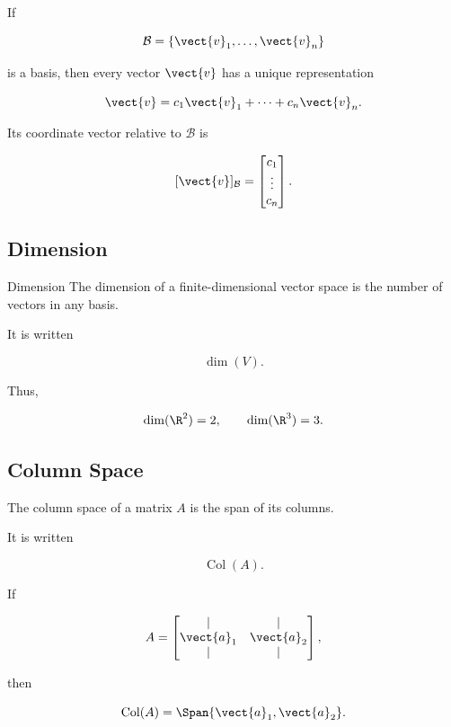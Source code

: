 If

\[ \mathcal B=\{\vect{v}_1,\ldots,\vect{v}_n\} \]

is a basis, then every vector \(\vect{v}\) has a unique representation

\[ \vect{v}=c_1\vect{v}_1+\cdots+c_n\vect{v}_n. \]

Its coordinate vector relative to \(\mathcal B\) is

\[ [\vect{v}]_{\mathcal B}
=
\begin{bmatrix}c_1\\\vdots\\c_n\end{bmatrix}. \]

\subsection{Dimension}
\label{subsec:dimension}

\begin{definitionbox}{Dimension}
The dimension of a finite-dimensional vector space is the number of vectors
in any basis.
\end{definitionbox}

It is written

\[ \dim(V). \]

Thus,

\[ \dim(\R^2)=2,\qquad \dim(\R^3)=3. \]

\subsection{Column Space}
\label{subsec:column-space}

The column space of a matrix \(A\) is the span of its columns.

It is written

\[ \operatorname{Col}(A). \]

If

\[ A=\begin{bmatrix}\vert&\vert\\\vect{a}_1&\vect{a}_2\\\vert&\vert\end{bmatrix}, \]

then

\[ \operatorname{Col}(A)=\Span\{\vect{a}_1,\vect{a}_2\}. \]

